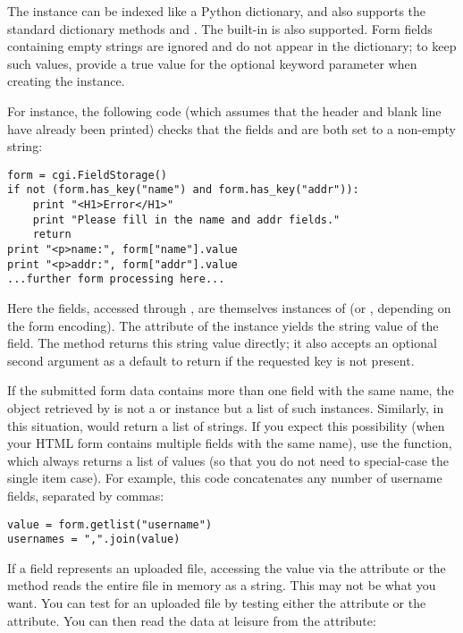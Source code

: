The  instance can be indexed like a Python
dictionary, and also supports the standard dictionary methods
 and .  The built-in 
is also supported.  Form fields containing empty strings are ignored
and do not appear in the dictionary; to keep such values, provide
a true value for the optional  keyword
parameter when creating the  instance.

For instance, the following code (which assumes that the 
 header and blank line have already been
printed) checks that the fields  and  are both
set to a non-empty string:

\begin{verbatim}
form = cgi.FieldStorage()
if not (form.has_key("name") and form.has_key("addr")):
    print "<H1>Error</H1>"
    print "Please fill in the name and addr fields."
    return
print "<p>name:", form["name"].value
print "<p>addr:", form["addr"].value
...further form processing here...
\end{verbatim}

Here the fields, accessed through , are
themselves instances of  (or
, depending on the form encoding).
The  attribute of the instance yields the string value
of the field.  The  method returns this string value
directly; it also accepts an optional second argument as a default to
return if the requested key is not present.

If the submitted form data contains more than one field with the same
name, the object retrieved by  is not a
 or 
instance but a list of such instances.  Similarly, in this situation,
 would return a list of strings.
If you expect this possibility
(when your HTML form contains multiple fields with the same name), use
the  function, which always returns a list of values (so that you
do not need to special-case the single item case).  For example, this
code concatenates any number of username fields, separated by
commas:

\begin{verbatim}
value = form.getlist("username")
usernames = ",".join(value)
\end{verbatim}

If a field represents an uploaded file, accessing the value via the
 attribute or the  method reads the
entire file in memory as a string.  This may not be what you want.
You can test for an uploaded file by testing either the 
attribute or the  attribute.  You can then read the data at
leisure from the  attribute:

